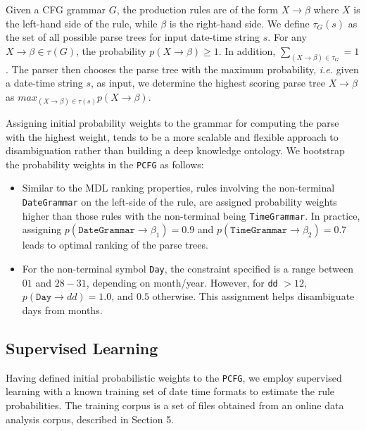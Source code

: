 Given a CFG grammar $G$, the production rules are of the form $ X \rightarrow \beta$ where $X$ is the left-hand side of the rule, while $\beta$ is the right-hand side. We define  $\tau_G(s)$ as the set of all possible parse trees for input date-time string $s$.  For any $X \rightarrow \beta \in \tau(G)$, the probability $p(X \rightarrow \beta) \ge 1$. In addition, $\sum_{(X \rightarrow \beta) \in \tau_{G}} = 1$. The parser then chooses the parse tree with the maximum probability, \textit{i.e.} given a date-time string $s$, as input, we determine the highest scoring parse tree $X \rightarrow \beta$ as  $max_{(X \rightarrow \beta) \in \tau(s)} p(X \rightarrow \beta)$.


Assigning initial probability weights to the grammar for computing the parse with the highest weight, tends to be a more scalable and flexible approach to disambiguation rather than building a deep knowledge ontology. We bootstrap the probability weights in the \texttt{PCFG} as follows:

\begin{itemize}
\setlength\itemsep{0em}
\item Similar to the MDL ranking properties, rules involving the non-terminal \texttt{DateGrammar} on the left-side of the rule, are assigned probability weights higher than those rules with the non-terminal being \texttt{TimeGrammar}. In practice, assigning $p(\texttt{DateGrammar} \rightarrow \beta_{1}) = 0.9$ and $p(\texttt{TimeGrammar} \rightarrow \beta_{2}) = 0.7$ leads to optimal ranking of the parse trees.

\item For the non-terminal symbol \texttt{Day}, the constraint specified is a range between $01$ and $28-31$, depending on month/year. However, for \texttt{dd} $> 12$, $p(\texttt{Day} \rightarrow d d) = 1.0$, and $0.5$ otherwise. This assignment helps disambiguate days from months.




\end{itemize}

\subsection{Supervised Learning}

Having defined initial probabilistic weights to the \texttt{PCFG}, we employ supervised learning with a known training set of date time formats to estimate the rule probabilities.  The training corpus is a set of files obtained from an online data analysis corpus, described in Section 5.

